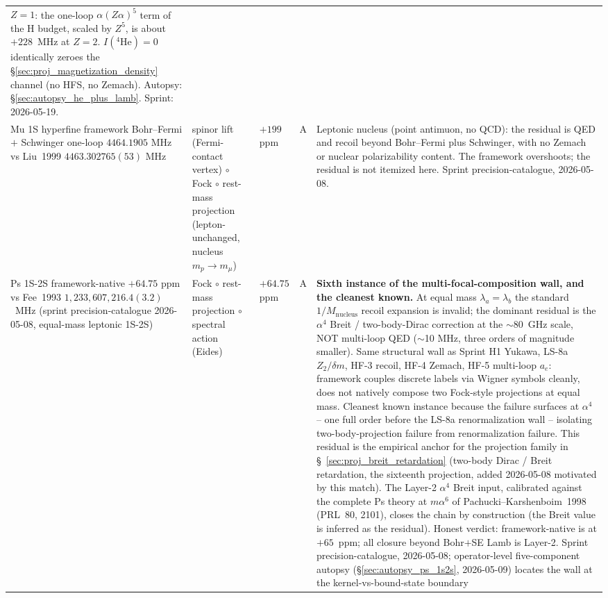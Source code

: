 \documentclass[11pt]{article}
\begin{document}
{\begin{longtable}{p{3.8cm} p{2.5cm} p{1.5cm} p{1.4cm} p{4.5cm}}
$Z=1$: the one-loop $\alpha(Z\alpha)^5$ term of the H budget, scaled by
$Z^5$, is about $+228$~MHz at $Z=2$.  $I({}^4\text{He}) = 0$ identically
zeroes the \S\ref{sec:proj_magnetization_density} channel (no HFS, no
Zemach).
Autopsy: \S\ref{sec:autopsy_he_plus_lamb}.  Sprint:
2026-05-19. \\
Mu 1S hyperfine framework Bohr--Fermi $+$ Schwinger one-loop
$4464.1905$ MHz vs Liu~1999 $4463.302765(53)$ MHz & spinor lift
(Fermi-contact vertex) $\circ$ Fock $\circ$ rest-mass projection
(lepton-unchanged, nucleus $m_p \to m_\mu$) & $+199$ ppm & A &
Leptonic nucleus (point antimuon, no QCD): the residual is QED and
recoil beyond Bohr--Fermi plus Schwinger, with no Zemach or nuclear
polarizability content.  The framework overshoots; the residual is not
itemized here.  Sprint
precision-catalogue, 2026-05-08. \\
Ps 1S-2S framework-native $+64.75$ ppm vs Fee~1993
$1{,}233{,}607{,}216.4(3.2)$~MHz (sprint precision-catalogue 2026-05-08,
equal-mass leptonic 1S-2S) & Fock $\circ$ rest-mass projection $\circ$
spectral action (Eides) & $+64.75$ ppm & A & \textbf{Sixth instance of
the multi-focal-composition wall, and the cleanest known.}  At equal
mass $\lambda_a = \lambda_b$ the standard $1/M_\text{nucleus}$ recoil
expansion is invalid; the dominant residual is the $\alpha^4$ Breit /
two-body-Dirac correction at the $\sim 80$~GHz scale, NOT multi-loop
QED ($\sim$10 MHz, three orders of magnitude smaller).  Same structural
wall as Sprint H1 Yukawa, LS-8a $Z_2/\delta m$, HF-3 recoil, HF-4
Zemach, HF-5 multi-loop $a_e$: framework couples discrete labels via
Wigner symbols cleanly, does not natively compose two Fock-style
projections at equal mass.  Cleanest known instance because the failure
surfaces at $\alpha^4$ -- one full order before the LS-8a renormalization
wall -- isolating two-body-projection failure from renormalization
failure.  This residual is the empirical anchor for the projection family
in \S~\ref{sec:proj_breit_retardation} (two-body Dirac / Breit
retardation, the sixteenth projection, added 2026-05-08 motivated by
this match).  The Layer-2 $\alpha^4$ Breit input, calibrated against
the complete Ps theory at $m\alpha^6$ of Pachucki--Karshenboim~1998
(PRL~80, 2101), closes the chain by construction (the Breit value is
inferred as the residual).  Honest
verdict: framework-native is at $+65$~ppm; all closure beyond Bohr$+$SE
Lamb is Layer-2.  Sprint precision-catalogue, 2026-05-08; operator-level
five-component autopsy (\S\ref{sec:autopsy_ps_1s2s}, 2026-05-09)
locates the wall at the kernel-vs-bound-state boundary

\end{longtable}}
\end{document}
